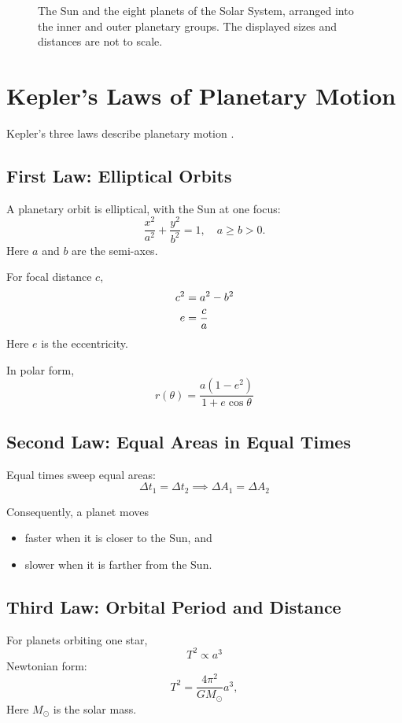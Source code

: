 \documentclass[11pt]{article}
\newcommand{\be}{\begin{equation}}
\newcommand{\ee}{\end{equation}}
\begin{document}
\begin{figure}[t]
    \caption{The Sun and the eight planets of the Solar System, arranged into the inner and outer planetary groups. The displayed sizes and distances are not to scale.}
    \label{fig:solar}
\end{figure}

\section{Kepler’s Laws of Planetary Motion}
Kepler’s three laws describe planetary motion \cite{nasa_kepler}.


\subsection{First Law: Elliptical Orbits}
A planetary orbit is elliptical, with the Sun at one focus:
\be
\frac{x^2}{a^2} + \frac{y^2}{b^2} =  1, \quad a \ge b > 0.
\ee
Here $a$ and $b$ are the semi-axes.

For focal distance $c$,
\begin{align}
    c^2 &= a^2 - b^2 \notag \\
    e &= \frac{c}{a}\\
\end{align}
Here $e$ is the eccentricity.

In polar form,
\be
r(\theta) = \frac{a(1-e^2)}{1+e\cos\theta}
\ee


\subsection{Second Law: Equal Areas in Equal Times}
Equal times sweep equal areas:
\be
\Delta t_1 = \Delta t_2 \implies \Delta A_1 = \Delta A_2
\ee

Consequently, a planet moves
\begin{itemize}[label=$\diamond$]
    \item faster when it is closer to the Sun, and
    \item slower when it is farther from the Sun.
\end{itemize}

\subsection{Third Law: Orbital Period and Distance}
For planets orbiting one star,
\be
T^2 \propto a^3
\ee
Newtonian form:
\be
T^2 = \frac{4\pi^2}{GM_{\odot}}a^3,
\ee
Here $M_{\odot}$ is the solar mass.
\end{document}
